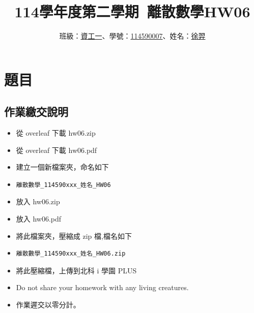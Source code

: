 \documentclass[sigconf]{acmart}
\begin{document}
\title{114學年度第二學期~離散數學HW06}

\author{班級：\underline{資工一}、學號：\underline{114590007}、姓名：\underline{徐羿}}
\orcid{}
\affiliation{%
  \institution{}
  \city{}
  \country{}
}

\renewcommand\footnotetextcopyrightpermission[1]{} %
\pagestyle{plain} %

\maketitle


\section{題目}
\subsection{作業繳交說明}
\begin{shaded}
\begin{itemize}
    \item[-] 從 overleaf 下載 hw06.zip
    \item[-] 從 overleaf 下載 hw06.pdf
    \item[-] 建立一個新檔案夾，命名如下
    \item[-] \color{red}\begin{verbatim}離散數學_114590xxx_姓名_HW06\end{verbatim}
    \item[-] \color{black}放入 hw06.zip
    \item[-] 放入 hw06.pdf
    \item[-] 將此檔案夾，壓縮成 zip 檔,檔名如下
    \item[-] \color{red}\begin{verbatim}離散數學_114590xxx_姓名_HW06.zip\end{verbatim}
    \item[-] \color{black}將此壓縮檔，上傳到北科 i 學園 PLUS
    \item[-] Do not share your homework with any living creatures.
    \item[-] 作業遲交以零分計。
\end{itemize}
\end{shaded}
\end{document}
